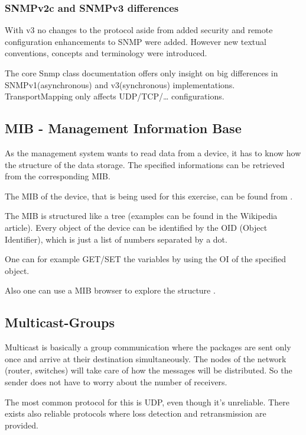 \documentclass[11pt, a4paper]{article}
\begin{document}

\subsubsection{SNMPv2c and SNMPv3 differences}

With v3 no changes to the protocol aside from added security and remote configuration enhancements to SNMP were added. However new textual conventions, concepts and terminology were introduced.

The core Snmp class documentation \cite{SNMP4JDoc} offers only insight on big differences in SNMPv1(asynchronous) and v3(synchronous) implementations. TransportMapping only affects UDP/TCP/… configurations.

\subsection{MIB - Management Information Base}
As the management system wants to read data from a device, it has to know how the structure of the data storage. The specified informations can be retrieved from the corresponding MIB. 

The MIB of the device, that is being used for this exercise, can be found from \cite{MIBDownload}.

The MIB is structured like a tree (examples can be found in the Wikipedia article). Every object of the device can be identified by the OID (Object Identifier), which is just a list of numbers separated by a dot.

One can for example GET/SET the variables by using the OI of the specified object.

Also one can use a MIB browser to explore the structure \cite{MIBBrowser}.
\subsection{Multicast-Groups}

Multicast is basically a group communication where the packages are sent only once and arrive at their destination simultaneously. The nodes of the network (router, switches) will take care of how the messages will be distributed. So the sender does not have to worry about the number of receivers.

The most common protocol for this is UDP, even though it’s unreliable. There exists also reliable protocols where loss detection and retransmission are provided.
\end{document}
